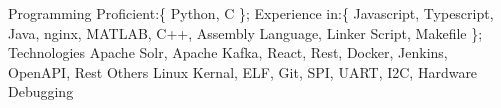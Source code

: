 

\begin{cvskills}

  \cvskill
    {Programming} %
    {Proficient:\{ Python, C \}; Experience in:\{ Javascript, Typescript, Java, nginx, MATLAB, C++, Assembly Language, Linker Script, Makefile \};} %
  \cvskill
    {Technologies} %
    {Apache Solr, Apache Kafka, React, Rest, Docker, Jenkins, OpenAPI, Rest} %
  \cvskill
    {Others} %
    {Linux Kernal, ELF, Git, SPI, UART, I2C, Hardware Debugging } %


\end{cvskills}
